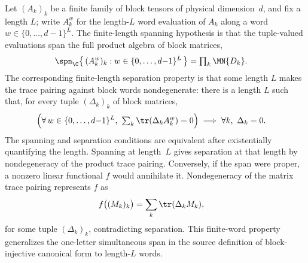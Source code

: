 \begin{remark}%
    \label{rem:word_tuple_span_top}
    \leanok
    Let $(A_k)_{k}$ be a finite family of block tensors of physical
    dimension~$d$, and fix a length $L$; write $A_k^w$ for the length-$L$
    word evaluation of $A_k$ along a word $w \in \{0,\ldots,d{-}1\}^L$. The
    finite-length spanning hypothesis is that the tuple-valued evaluations
    span the full product algebra of block matrices,
    \begin{align}
        \spn_{\C}\bigl\{\,(A_k^w)_k
        : w \in \{0,\ldots,d{-}1\}^L\,\bigr\}
         & =\textstyle\prod_k \MN{D_k}.
        \label{eq:mpdo_word_tuple_span}
    \end{align}
    The corresponding finite-length separation property is that some length
    $L$ makes the trace pairing against block words nondegenerate: there is
    a length $L$ such that, for every tuple $(\Delta_k)_k$ of block
    matrices,
    \begin{align}
        \Bigl(\forall\, w \in \{0,\ldots,d{-}1\}^L,\
        \textstyle\sum_k \tr(\Delta_k A_k^w) = 0\Bigr)
         & \implies \forall k,\ \Delta_k = 0.
        \label{eq:mpdo_finite_separation}
    \end{align}
    The spanning and separation conditions are equivalent after existentially
    quantifying the length. Spanning at length~$L$ gives separation at that
    length by nondegeneracy of the product trace pairing. Conversely, if the
    span were proper, a nonzero linear functional $f$ would annihilate it.
    Nondegeneracy of the matrix trace pairing represents $f$ as
    \begin{align}
        f\bigl((M_k)_k\bigr) & =\sum_k\tr(\Delta_kM_k), \notag
    \end{align}
    for some tuple $(\Delta_k)_k$, contradicting separation. This finite-word
    property generalizes the one-letter simultaneous span in the source
    definition of block-injective canonical form to length-$L$ words.


\end{remark}
